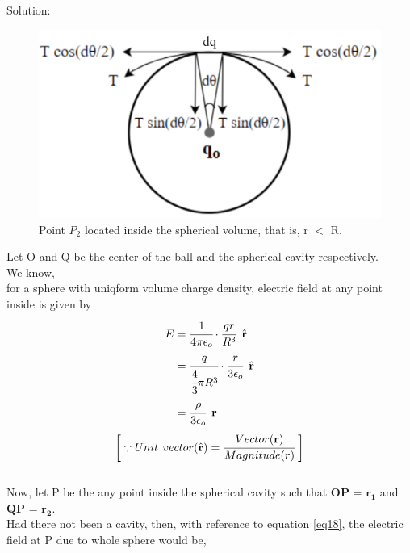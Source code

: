 Solution:
\begin{figure}
     \centering 
     \includegraphics[scale = 0.46]{figures/Sandesh's Figures/tnsnrng.png}
     \caption{Point $P_2$ located inside the spherical volume, that is, r $<$ R. }
     \label{tnsrng}
 \end{figure}
 Let O and Q be the center of the ball and the spherical cavity respectively.\\
 We know,\\
 for a sphere with uniqform volume charge   density, electric field at any point inside is given by
 \begin{align}
     E &= \cfrac{1}{4 \pi \epsilon_o}\cdot \cfrac{qr}{R^3}\hspace{5pt} \hat{\textbf{r}} \nonumber \\
     &= \cfrac{q}{\cfrac{4}{3}\pi R^3} \cdot \cfrac{r}{3 \epsilon_o} \hspace{5pt}\hat{\textbf{r}} \nonumber \\
     &= \cfrac{\rho}{3 \epsilon_o} \hspace{5pt}\bm{\textbf{r}} \label{eq18}
 \end{align}
 \[ \bigg[\because Unit\hspace{4pt}vector (\hat{\textbf{r}}) = \cfrac{Vector (\bm{\textbf{r}})}{Magnitude (r)} \hspace{3pt}\bigg]\]
 \\
 \vfill
Now, let P be the any point inside the spherical cavity such that $\bm{OP}$ = $\bm{r_1}$ and $\bm{QP}$ = $\bm{r_2}$.
\vspace{3pt}
\\
Had there not been a cavity, then, with reference to equation \ref{eq18}, the electric field at P due to whole sphere would be, 

